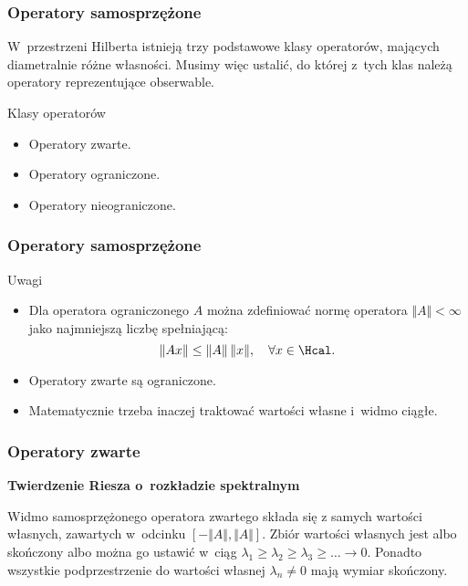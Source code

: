 \documentclass[10pt,t]{beamer}
\begin{document}
\begin{frame}
  \frametitle{Operatory samosprzężone}


  W~przestrzeni Hilberta istnieją trzy podstawowe klasy operatorów, mających
  diametralnie różne własności. Musimy więc ustalić, do której z~tych klas
  należą operatory reprezentujące obserwable.

  Klasy operatorów
  \begin{itemize}
    \RaggedRight

  \item Operatory zwarte.

  \item Operatory ograniczone.

  \item Operatory nieograniczone.

  \end{itemize}

\end{frame}





\begin{frame}
  \frametitle{Operatory samosprzężone}


  Uwagi
  \begin{itemize}
    \RaggedRight

  \item Dla operatora ograniczonego $A$ można zdefiniować normę operatora
    $\Vert A \Vert < \infty$ jako najmniejszą liczbę spełniającą:
    \begin{equation}
      \label{eq:Matematyczna-strona-03}
      \Vert A x \Vert \leq \Vert A \Vert \, \Vert x \Vert, \quad
      \forall x \in \Hcal.
    \end{equation}

  \item Operatory zwarte są ograniczone.

  \item Matematycznie trzeba inaczej traktować wartości własne i~widmo
    ciągłe.

  \end{itemize}

\end{frame}





\begin{frame}
  \frametitle{Operatory zwarte}


  \textbf{Twierdzenie Riesza o~rozkładzie spektralnym}

  Widmo samosprzężonego operatora zwartego składa się z samych wartości
  własnych, zawartych w~odcinku $[ -\Vert A \Vert, \Vert A \Vert ]$. Zbiór wartości
  własnych jest albo skończony albo można go ustawić w~ciąg
  $\lambda_{ 1 } \geq \lambda_{ 2 } \geq \lambda_{ 3 } \geq \ldots \to 0$. Ponadto wszystkie podprzestrzenie
  do wartości własnej $\lambda_{ n } \neq 0$ mają wymiar skończony.

\end{frame}
\end{document}
